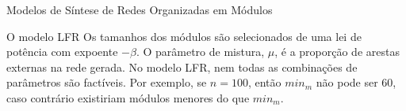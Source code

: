 \begin{section}{Modelos de Síntese de Redes Organizadas em Módulos}
\begin{subsection}{O modelo LFR}
Os tamanhos dos módulos são selecionados de uma lei de potência com expoente $-\beta$. O parâmetro de mistura, $\mu$, é a proporção de arestas externas na rede gerada. No modelo LFR, nem todas as combinações de parâmetros são factíveis. Por exemplo, se $n = 100$, então $min_m$ não pode ser 60, caso contrário existiriam módulos menores do que $min_m$.

\end{subsection}

\end{section}